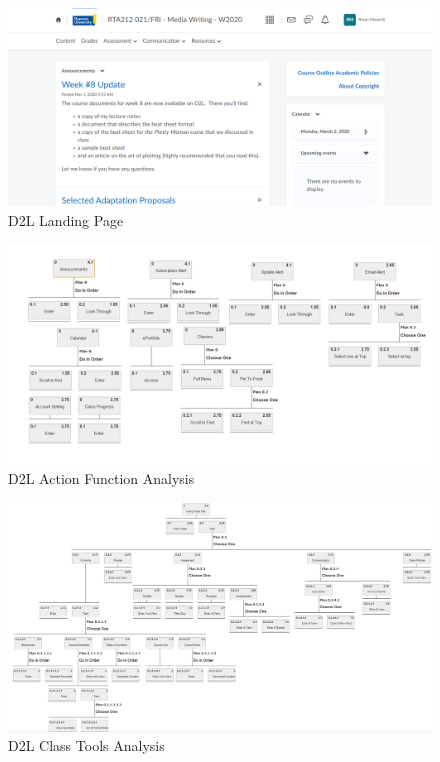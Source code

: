 \documentclass[12pt]{article}
\begin{document}
    \begin{figure}[H]
        \includegraphics[width=\textwidth]{hta/D2L.png}
        \caption{D2L Landing Page}
    \end{figure}
    \begin{figure}[H]
        \includegraphics[width=\textwidth]{hta/D2L_Access_Function.png}
        \caption{D2L Action Function Analysis}
    \end{figure}
    \begin{figure}[H]
        \includegraphics[width=\textwidth]{hta/D2L_Class_Tools.png}
        \caption{D2L Class Tools Analysis}
    \end{figure}
\end{document}
